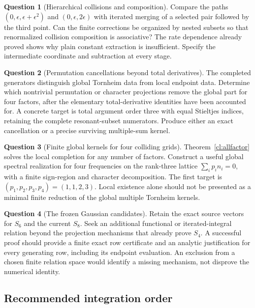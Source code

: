 \documentclass[11pt,a4paper]{article}
\numberwithin{equation}{section}
\theoremstyle{definition}
\newtheorem{question}{Question}
\theoremstyle{remark}
\begin{document}
\begin{question}[Hierarchical collisions and composition]
Compare the paths $(0,\epsilon,\epsilon+\epsilon^2)$ and
$(0,\epsilon,2\epsilon)$ with iterated merging of a selected
pair followed by the third point. Can the finite corrections
be organized by nested subsets so that renormalized collision
composition is associative? The rate dependence already proved
shows why plain constant extraction is insufficient. Specify
the intermediate coordinate and subtraction at every stage.
\end{question}

\begin{question}[Permutation cancellations beyond total derivatives]
The completed generators distinguish global Tornheim data from
local endpoint data. Determine which nontrivial permutation
or character projections remove the global part for four
factors, after the elementary total-derivative identities have
been accounted for. A concrete target is total argument order
three with equal Stieltjes indices, retaining the complete
resonant-subset numerators. Produce either an exact cancellation
or a precise surviving multiple-sum kernel.
\end{question}

\begin{question}[Finite global kernels for four colliding grids]
Theorem~\ref{cl:allfactor} solves the local completion for any
number of factors. Construct a useful global spectral realization
for four frequencies on the rank-three lattice
$\sum_i p_i n_i=0$, with a finite sign-region and character
decomposition. The first target is $(p_1,p_2,p_3,p_4)=(1,1,2,3)$.
Local existence alone should not be presented as a minimal
finite reduction of the global multiple Tornheim kernels.
\end{question}

\begin{question}[The frozen Gaussian candidates]
Retain the exact source vectors for $S_6$ and the current $S_8$.
Seek an additional functional or iterated-integral relation
beyond the projection mechanisms that already prove $S_4$.
A successful proof should provide a finite exact row certificate
and an analytic justification for every generating row,
including its endpoint evaluation. An exclusion from a chosen
finite relation space would identify a missing mechanism,
not disprove the numerical identity.
\end{question}

\subsection{Recommended integration order}
\end{document}
